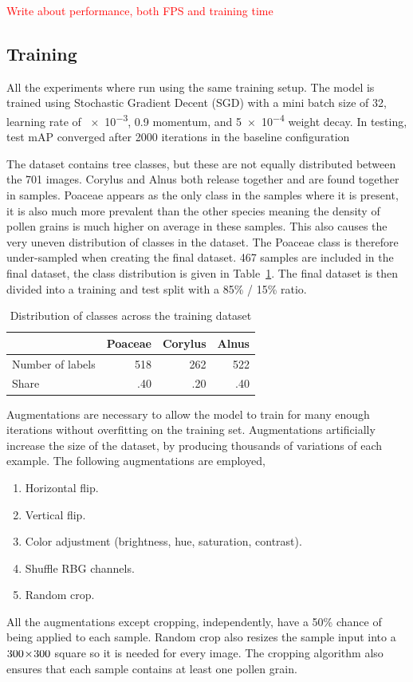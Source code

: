 \textcolor{red}{Write about performance, both FPS and training time}

\subsection{Training}
All the experiments where run using the same training setup.
The model is trained using Stochastic Gradient Decent (SGD) with a mini batch size of 32, learning rate of \num{e-3}, \num{0.9} momentum, and \num{5e-4} weight decay.
In testing, test mAP converged after 2000 iterations in the baseline configuration

The dataset contains tree classes, but these are not equally distributed between the 701 images.
Corylus and Alnus both release together and are found together in samples.
Poaceae appears as the only class in the samples where it is present, it is also much more prevalent than the other species meaning the density of pollen grains is much higher on average in these samples.
This also causes the very uneven distribution of classes in the dataset.
The Poaceae class is therefore under-sampled when creating the final dataset.
467 samples are included in the final dataset, the class distribution is given in Table~\ref{tab:training-dataset}.
The final dataset is then divided into a training and test split with a 85\% / 15\% ratio.

\begin{table}[htb]
  \caption[Class distribution across the final training dataset containing 467 sample images.]{Distribution of classes across the training dataset}\label{tab:training-dataset}
  \centering
  \begin{tabular}{lrrr} \toprule
                      & Poaceae & Corylus & Alnus \\ \midrule
    Number of labels  & 518    & 262     & 522 \\
    Share             & .40  & .20  & .40 \\ \bottomrule
  \end{tabular}
\end{table}

Augmentations are necessary to allow the model to train for many enough iterations without overfitting on the training set.
Augmentations artificially increase the size of the dataset, by producing thousands of variations of each example.
The following augmentations are employed,
%
\begin{enumerate}
  \item Horizontal flip.
  \item Vertical flip.
  \item Color adjustment (brightness, hue, saturation, contrast).
  \item Shuffle RBG channels.
  \item Random crop.
\end{enumerate}
%
All the augmentations except cropping, independently, have a 50\% chance of being applied to each sample.
Random crop also resizes the sample input into a \(300\!\times \! 300\) square so it is needed for every image.
The cropping algorithm also ensures that each sample contains at least one pollen grain.

